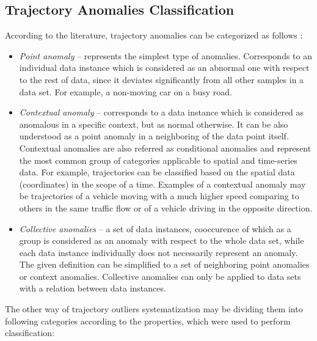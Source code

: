\subsection{Trajectory Anomalies Classification}

According to the literature, trajectory anomalies can be categorized as follows \cite{article:15_survey_ad}\cite{article:6_survey_anom_det_rtuvs}\cite{article:comp_analys_odt}:

\begin{itemize}
	\setlength\itemsep{0em}
	\item \textit{Point anomaly} -- represents the simplest type of anomalies. Corresponds to an individual data instance which is considered as an abnormal one with respect to the rest of data, since it deviates significantly from all other samples in a data set. For example, a non-moving car on a busy road.
	\item \textit{Contextual anomaly} -- corresponds to a data instance which is considered as anomalous in a specific context, but as normal otherwise. It can be also understood as a point anomaly in a neighboring of the data point itself. Contextual anomalies are also referred as conditional anomalies and represent the most common group of categories applicable to spatial and time-series data. For example, trajectories can be classified based on the spatial data (coordinates) in the scope of a time. Examples of a contextual anomaly may be trajectories of a vehicle moving with a much higher speed comparing to others in the same traffic flow or of a vehicle driving in the opposite direction.
	\item \textit{Collective anomalies} -- a set of data instances, cooccurence of which as a group is considered as an anomaly with respect to the whole data set, while each data instance individually does not necessarily represent an anomaly. The given definition can be simplified to a set of neighboring point anomalies or context anomalies. Collective anomalies can only be applied to data sets with a relation between data instances.
\end{itemize}
 
The other way of trajectory outliers systematization may be dividing them into following categories according to the properties, which were used to perform classification: 

